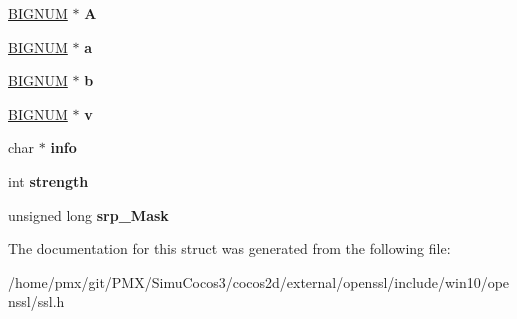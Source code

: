 \begin{DoxyCompactItemize}
\item 
\mbox{\label{structsrp__ctx__st_a65bcccab6ee5eb609c2304fd3a2a7c3f}} 
\hyperlink{structbignum__st}{B\+I\+G\+N\+UM} $\ast$ {\bfseries A}
\item 
\mbox{\label{structsrp__ctx__st_a5d063ec2dc87cc7351ced5b25de67e3f}} 
\hyperlink{structbignum__st}{B\+I\+G\+N\+UM} $\ast$ {\bfseries a}
\item 
\mbox{\label{structsrp__ctx__st_aee9feaedd4dd38b5532c35c3b8b366d5}} 
\hyperlink{structbignum__st}{B\+I\+G\+N\+UM} $\ast$ {\bfseries b}
\item 
\mbox{\label{structsrp__ctx__st_a822ab1c65a312a2baefa2c5f35d48ab4}} 
\hyperlink{structbignum__st}{B\+I\+G\+N\+UM} $\ast$ {\bfseries v}
\item 
\mbox{\label{structsrp__ctx__st_a6ca9932a9bf584ced4514a641da677aa}} 
char $\ast$ {\bfseries info}
\item 
\mbox{\label{structsrp__ctx__st_a7c4b3e2077d11a9ad4b45424bc098148}} 
int {\bfseries strength}
\item 
\mbox{\label{structsrp__ctx__st_a64b3466f134d404daadf0abf37589097}} 
unsigned long {\bfseries srp\+\_\+\+Mask}
\end{DoxyCompactItemize}


The documentation for this struct was generated from the following file\+:\begin{DoxyCompactItemize}
\item 
/home/pmx/git/\+P\+M\+X/\+Simu\+Cocos3/cocos2d/external/openssl/include/win10/openssl/ssl.\+h\end{DoxyCompactItemize}
